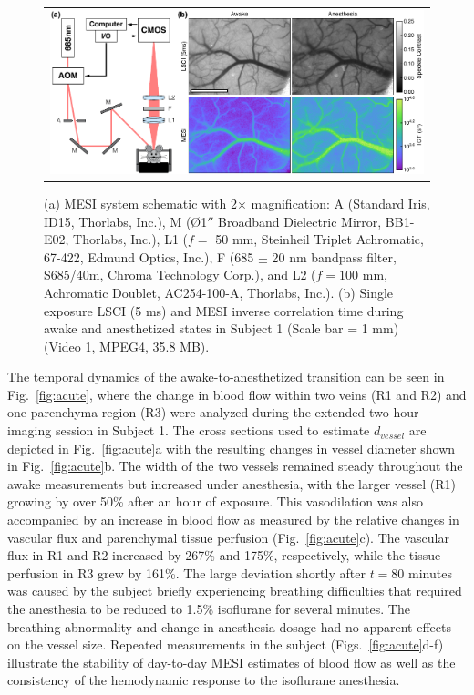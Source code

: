 \documentclass[12pt]{spieman}
\begin{document}
\begin{spacing}{2}
\begin{figure}
    \begin{center}
        \begin{tabular}{c}
            \includegraphics[width=6.25in]{Figure1.pdf}
        \end{tabular}
    \end{center}
    \caption {
        \label{fig:system_image}
        (a) MESI system schematic with 2$\times$ magnification: A (Standard Iris, ID15, Thorlabs, Inc.), M ({{\O}}1$''$ Broadband Dielectric Mirror, BB1-E02, Thorlabs, Inc.), L1 ($f =$ 50 mm, Steinheil Triplet Achromatic, 67-422, Edmund Optics, Inc.), F (685 $\pm$ 20 nm bandpass filter, S685/40m, Chroma Technology Corp.), and L2 ($f = 100$ mm, Achromatic Doublet, AC254-100-A, Thorlabs, Inc.). (b) Single exposure LSCI (5 ms) and MESI inverse correlation time during awake and anesthetized states in Subject 1 (Scale bar = 1 mm) (Video 1, MPEG4, 35.8 MB).
    }
\end{figure}

The temporal dynamics of the awake-to-anesthetized transition can be seen in Fig.~\ref{fig:acute}, where the change in blood flow within two veins (R1 and R2) and one parenchyma region (R3) were analyzed during the extended two-hour imaging session in Subject 1. The cross sections used to estimate $d_{vessel}$ are depicted in Fig.~\ref{fig:acute}a with the resulting changes in vessel diameter shown in Fig.~\ref{fig:acute}b. The width of the two vessels remained steady throughout the awake measurements but increased under anesthesia, with the larger vessel (R1) growing by over 50\% after an hour of exposure. This vasodilation was also accompanied by an increase in blood flow as measured by the relative changes in vascular flux and parenchymal tissue perfusion (Fig.~\ref{fig:acute}c). The vascular flux in R1 and R2 increased by 267\% and 175\%, respectively, while the tissue perfusion in R3 grew by 161\%. The large deviation shortly after $t = 80$ minutes was caused by the subject briefly experiencing breathing difficulties that required the anesthesia to be reduced to 1.5\% isoflurane for several minutes. The breathing abnormality and change in anesthesia dosage had no apparent effects on the vessel size. Repeated measurements in the subject (Figs.~\ref{fig:acute}d-f) illustrate the stability of day-to-day MESI estimates of blood flow as well as the consistency of the hemodynamic response to the isoflurane anesthesia.


\end{spacing}
\end{document}
